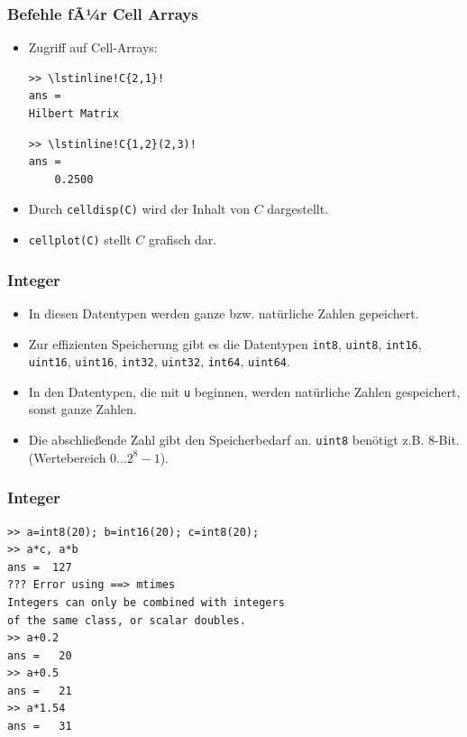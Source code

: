 \begin{frame}[fragile]\frametitle{Befehle fÃ¼r Cell Arrays}
\begin{itemize}
\item Zugriff auf Cell-Arrays:\\ 
\begin{minipage}{5cm}
\begin{lstlisting} 
>> \lstinline!C{2,1}!
ans =
Hilbert Matrix
\end{lstlisting}
\end{minipage}
\begin{minipage}{5cm}
\begin{lstlisting}
>> \lstinline!C{1,2}(2,3)!
ans =
    0.2500
\end{lstlisting}
\end{minipage}
\item Durch \lstinline!celldisp(C)! wird der Inhalt von $C$ dargestellt.
\item \lstinline!cellplot(C)! stellt $C$ grafisch dar.
\end{itemize}
\end{frame}
%
%
\begin{frame}[fragile]\frametitle{Integer}
\begin{itemize}
\item In diesen Datentypen werden ganze bzw. nat\"urliche Zahlen gepeichert.  
\item Zur effizienten Speicherung gibt es die Datentypen \lstinline!int8!,
\lstinline!uint8!, \lstinline!int16!, \lstinline!uint16!, \lstinline!uint16!, \lstinline!int32!,
\lstinline!uint32!, \lstinline!int64!, \lstinline!uint64!. 
\item In den Datentypen, die mit \lstinline!u! beginnen, werden nat\"urliche Zahlen
gespeichert, sonst ganze Zahlen.
\item Die abschlie{\ss}ende Zahl gibt den Speicherbedarf an. \lstinline!uint8!
ben\"otigt z.B. $8$-Bit. (Wertebereich $0 \dots 2^8-1$).
\end{itemize}
\end{frame}
%
%
\begin{frame}[fragile]\frametitle{Integer}
\begin{lstlisting}
>> a=int8(20); b=int16(20); c=int8(20);
>> a*c, a*b
ans =  127
??? Error using ==> mtimes
Integers can only be combined with integers
of the same class, or scalar doubles.
>> a+0.2
ans =   20
>> a+0.5
ans =   21
>> a*1.54
ans =   31
\end{lstlisting}
\end{frame}
%
%
%
